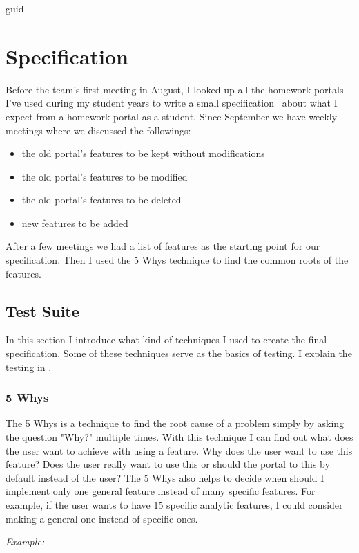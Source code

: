 guid\chapter{Specification}

Before the team's first meeting in August, I looked up all the homework portals I've used during my student years to write a small specification~\cite{Szepes-specification} about what I expect from a homework portal as a student. Since September we have weekly meetings where we discussed the followings: 

\begin{itemize}
	\item the old portal's features to be kept without modifications
	\item the old portal's features to be modified
	\item the old portal's features to be deleted
	\item new features to be added
\end{itemize}

After a few meetings we had a list of features as the starting point for our specification. Then I used the 5 Whys technique to find the common roots of the features. 

\section{Test Suite}
In this section I introduce what kind of techniques I used to create the final specification. Some of these techniques serve as the basics of testing. I explain the testing in . 

\subsection{5 Whys}
\label{5-whys}

The 5 Whys is a technique to find the root cause of a problem simply by asking the question "Why?" multiple times. With this technique I can find out what does the user want to achieve with using a feature. Why does the user want to use this feature? Does the user really want to use this or should the portal to this by default instead of the user? The 5 Whys also helps to decide when should I implement only one general feature instead of many specific features. For example, if the user wants to have 15 specific analytic features, I could consider making a general one instead of specific ones. 

\emph{Example:}


